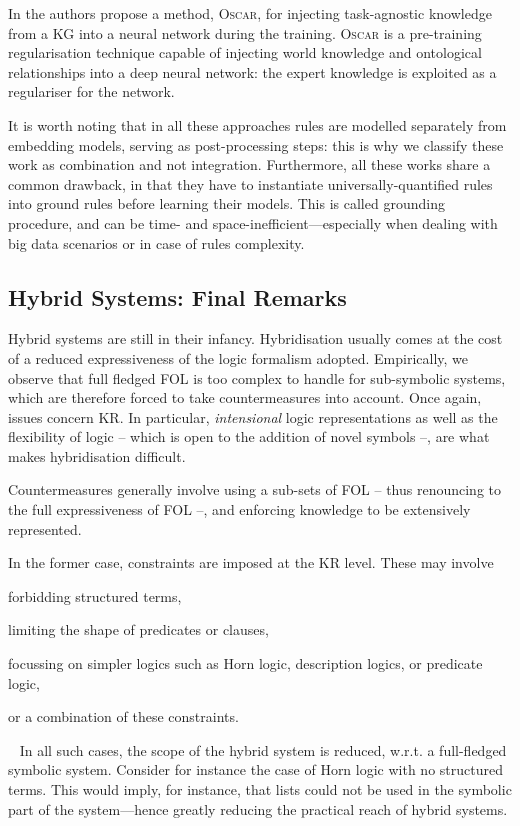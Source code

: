 \documentclass[12pt,a4paper,openright,twoside]{book}
\begin{document}
In \cite{goodwin2019} the authors propose a method, \textsc{Oscar}, for injecting task-agnostic knowledge from a KG into a neural network during the training.
%
\textsc{Oscar} is a pre-training regularisation technique capable of injecting world knowledge and ontological relationships into a deep neural network: the expert knowledge is exploited as a regulariser for the network.

It is worth noting that in all these approaches rules are modelled separately from embedding models, serving as post-processing steps: this is why we classify these work as combination and not integration.
%
Furthermore, all these works share a common drawback, in that they have to instantiate universally-quantified rules into ground rules before learning their models.
%
This is called grounding procedure, and can be time- and space-inefficient---especially when dealing with big data scenarios or in case of rules complexity.

\subsection{Hybrid Systems: Final Remarks}

Hybrid systems are still in their infancy.
%
Hybridisation usually comes at the cost of a reduced expressiveness of the logic formalism adopted.
%
Empirically, we observe that full fledged FOL is too complex to handle for sub-symbolic systems, which are therefore forced to take countermeasures into account.
%
Once again, issues concern KR.
%
In particular, \emph{intensional} logic representations as well as the flexibility of logic -- which is open to the addition of novel symbols --, are what makes hybridisation difficult.

Countermeasures generally involve using a sub-sets of FOL -- thus renouncing to the full expressiveness of FOL --, and enforcing knowledge to be extensively represented.

In the former case, constraints are imposed at the KR level.
%
These may involve
%
\begin{inlinelist}
    \item forbidding structured terms,
    \item limiting the shape of predicates or clauses,
    \item focussing on simpler logics such as Horn logic, description logics, or predicate logic,
    \item or a combination of these constraints.
\end{inlinelist}\
%
In all such cases, the scope of the hybrid system is reduced, w.r.t. a full-fledged symbolic system.
%
Consider for instance the case of Horn logic with no structured terms.
%
This would imply, for instance, that lists could not be used in the symbolic part of the system---hence greatly reducing the practical reach of hybrid systems.
\end{document}

